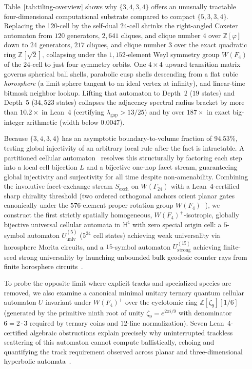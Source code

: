 Table~\ref{tab:tiling-overview} shows why $\{3,4,3,4\}$ offers an unusually tractable four-dimensional computational substrate compared to compact $\{5,3,3,4\}$. Replacing the 120-cell by the self-dual 24-cell shrinks the right-angled Coxeter automaton from $120$ generators, $2{,}641$ cliques, and clique number $4$ over $\mathbb{Z}[\varphi]$ down to $24$ generators, $217$ cliques, and clique number $3$ over the exact quadratic ring $\mathbb{Z}[\sqrt{2}]$, collapsing under the $1{,}152$-element Weyl symmetry group $W(F_4)$ of the 24-cell to just four symmetry orbits. One $4 \times 4$ upward transition matrix governs spherical ball shells, parabolic cusp shells descending from a flat cubic \emph{horosphere} (a limit sphere tangent to an ideal vertex at infinity), and linear-time bitmask neighbor lookup. Lifting that automaton to Depth~2 ($19$ states) and Depth~5 ($34{,}523$ states) collapses the adjacency spectral radius bracket by more than $10.2\times$ in Lean~4 (certifying $\lambda_{\mathrm{gap}} > 13/25$) and by over $187\times$ in exact big-integer arithmetic (width below $0.0047$).

Because $\{3,4,3,4\}$ has an asymptotic boundary-to-volume fraction of $94.53\%$, testing global injectivity of an arbitrary local rule after the fact is intractable. A partitioned cellular automaton~\cite{margolus1984,morita2017book} resolves this structurally by factoring each step into a local cell bijection $L$ and a bijective one-hop facet stream, guaranteeing global injectivity and surjectivity for all time despite non-amenability. Combining the involutive facet-exchange stream $S_{\mathrm{exch}}$ on $W(\Gamma_{24})$ with a Lean~4-certified sharp chirality threshold (two ordered orthogonal anchors orient planar gates canonically under the $576$-element proper rotation group $W(F_4)^+$), we construct the first strictly spatially homogeneous, $W(F_4)^+$-isotropic, globally bijective universal cellular automata in $\mathbb{H}^4$ with zero special origin cell: a $5$-symbol automaton $U_{\mathrm{univ}}^{(5)}$ ($5^{24}$ cell states) achieving weak universality via horosphere Morita circuits, and a $15$-symbol automaton $U_{\mathrm{strong}}^{(15)}$ achieving finite-seed strong universality by launching unbounded bulk geodesic counter rays from finite horosphere circuits~\cite{bennett1973,minsky1961,morita2001}.

To probe the opposite limit where explicit tracks and specialized species are removed, we also examine a canonical minimal unitary ternary quantum cellular automaton $U$ invariant under $W(F_4)^+$ over the cyclotomic ring $\mathbb{Z}[\zeta_9][1/6]$ (generated by the primitive ninth root of unity $\zeta_9 = e^{2\pi i/9}$ with denominator $6 = 2 \cdot 3$ required by ternary coins and $12$-line normalization). Seven Lean~4-certified algebraic obstructions explain precisely why uninterrupted trackless scattering of this automaton cannot compute ballistically, echoing and quantifying the track requirement observed across planar and three-dimensional hyperbolic automata~\cite{margenstern2021outer,margenstern2023weighted}.

